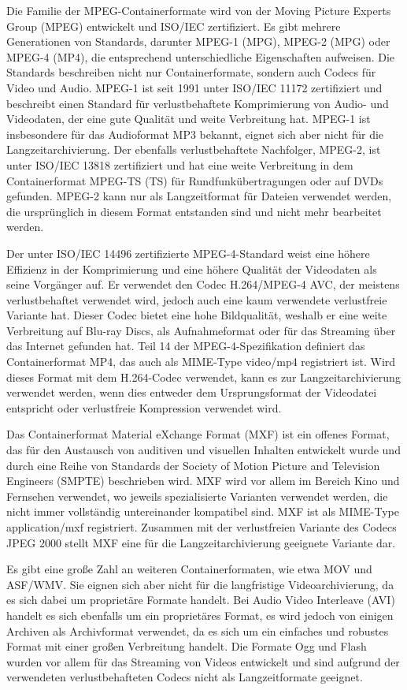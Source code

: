 Die Familie der MPEG-Containerformate wird von der Moving Picture Experts Group (MPEG) entwickelt und ISO/IEC zertifiziert. Es gibt mehrere Generationen von Standards, darunter MPEG-1 (MPG), MPEG-2 (MPG) oder MPEG-4 (MP4), die entsprechend unterschiedliche Eigenschaften aufweisen. Die Standards beschreiben nicht nur Containerformate, sondern auch Codecs für Video und Audio. MPEG-1 ist seit 1991 unter ISO/IEC 11172 zertifiziert und beschreibt einen Standard für verlustbehaftete Komprimierung von Audio- und Videodaten, der eine gute Qualität und weite Verbreitung hat. MPEG-1 ist insbesondere für das Audioformat MP3 bekannt, eignet sich aber nicht für die Langzeitarchivierung. Der ebenfalls verlustbehaftete Nachfolger, MPEG-2, ist unter ISO/IEC 13818 zertifiziert und hat eine weite Verbreitung in dem Containerformat MPEG-TS (TS) für Rundfunkübertragungen oder auf DVDs gefunden. MPEG-2 kann nur als Langzeitformat für Dateien verwendet werden, die ursprünglich in diesem Format entstanden sind und nicht mehr bearbeitet werden. 

Der unter ISO/IEC 14496 zertifizierte MPEG-4-Standard weist eine höhere Effizienz in der Komprimierung und eine höhere Qualität der Videodaten als seine Vorgänger auf. Er verwendet den Codec H.264/MPEG-4 AVC, der meistens verlustbehaftet verwendet wird, jedoch auch eine kaum verwendete verlustfreie Variante hat. Dieser Codec bietet eine hohe Bildqualität, weshalb er eine weite Verbreitung auf Blu-ray Discs, als Aufnahmeformat oder für das Streaming über das Internet gefunden hat. Teil 14 der MPEG-4-Spezifikation definiert das Containerformat MP4, das auch als MIME-Type video/mp4 registriert ist. Wird dieses Format mit dem H.264-Codec verwendet, kann es zur Langzeitarchivierung verwendet werden, wenn dies entweder dem Ursprungsformat der Videodatei entspricht oder verlustfreie Kompression verwendet wird.

Das Containerformat Material eXchange Format (MXF) ist ein offenes Format, das für den Austausch von auditiven und visuellen Inhalten entwickelt wurde und durch eine Reihe von Standards der Society of Motion Picture and Television Engineers (SMPTE) beschrieben wird. MXF wird vor allem im Bereich Kino und Fernsehen verwendet, wo jeweils spezialisierte Varianten verwendet werden, die nicht immer vollständig untereinander kompatibel sind. MXF ist als MIME-Type application/mxf registriert. Zusammen mit der verlustfreien Variante des Codecs JPEG 2000 stellt MXF eine für die Langzeitarchivierung geeignete Variante dar.

Es gibt eine große Zahl an weiteren Containerformaten, wie etwa MOV und ASF/WMV. Sie eignen sich aber nicht für die langfristige Videoarchivierung, da es sich dabei um proprietäre Formate handelt. Bei Audio Video Interleave (AVI) handelt es sich ebenfalls um ein proprietäres Format, es wird jedoch von einigen Archiven als Archivformat verwendet, da es sich um ein einfaches und robustes Format mit einer großen Verbreitung handelt. Die Formate Ogg und Flash wurden vor allem für das Streaming von Videos entwickelt und sind aufgrund der verwendeten verlustbehafteten Codecs nicht als Langzeitformate geeignet.

